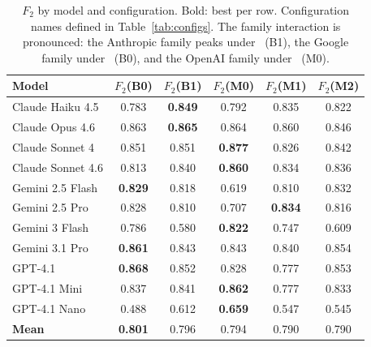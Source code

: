 \begin{table}[htbp]
  \centering
  \small
  \caption{$F_2$ by model and configuration. Bold: best per row.
  Configuration names defined in Table~\ref{tab:configs}.
  The family interaction is pronounced: the Anthropic family peaks under \cfgCoT\
  (B1), the Google family under \cfgZS\ (B0), and the OpenAI family under
  \cfgCX\ (M0).}
  \label{tab:h1-f2}
  \begin{tabular*}{\linewidth}{@{\extracolsep{\fill}}lccccc@{}}
    \toprule
    \textbf{Model} & $F_2$(B0) & $F_2$(B1) & $F_2$(M0) & $F_2$(M1) & $F_2$(M2) \\
    \midrule
    Claude Haiku 4.5   & 0.783 & \textbf{0.849} & 0.792 & 0.835 & 0.822 \\
    Claude Opus 4.6    & 0.863 & \textbf{0.865} & 0.864 & 0.860 & 0.846 \\
    Claude Sonnet 4    & 0.851 & 0.851 & \textbf{0.877} & 0.826 & 0.842 \\
    Claude Sonnet 4.6  & 0.813 & 0.840 & \textbf{0.860} & 0.834 & 0.836 \\
    Gemini 2.5 Flash   & \textbf{0.829} & 0.818 & 0.619 & 0.810 & 0.832 \\
    Gemini 2.5 Pro     & 0.828 & 0.810 & 0.707 & \textbf{0.834} & 0.816 \\
    Gemini 3 Flash     & 0.786 & 0.580 & \textbf{0.822} & 0.747 & 0.609 \\
    Gemini 3.1 Pro     & \textbf{0.861} & 0.843 & 0.843 & 0.840 & 0.854 \\
    GPT-4.1            & \textbf{0.868} & 0.852 & 0.828 & 0.777 & 0.853 \\
    GPT-4.1 Mini       & 0.837 & 0.841 & \textbf{0.862} & 0.777 & 0.833 \\
    GPT-4.1 Nano       & 0.488 & 0.612 & \textbf{0.659} & 0.547 & 0.545 \\
    \midrule
    \textbf{Mean}      & \textbf{0.801} & 0.796 & 0.794 & 0.790 & 0.790 \\
    \bottomrule
  \end{tabular*}
\end{table}

